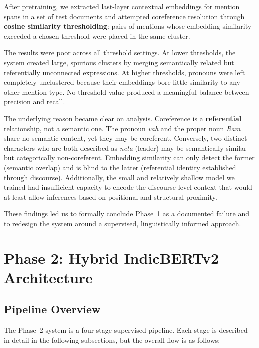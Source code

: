 \documentclass[12pt,a4paper]{report}
\begin{document}
After pretraining, we extracted last-layer contextual embeddings for mention spans in a set of test documents and attempted coreference resolution through \textbf{cosine similarity thresholding}: pairs of mentions whose embedding similarity exceeded a chosen threshold were placed in the same cluster.

The results were poor across all threshold settings. At lower thresholds, the system created large, spurious clusters by merging semantically related but referentially unconnected expressions. At higher thresholds, pronouns were left completely unclustered because their embeddings bore little similarity to any other mention type. No threshold value produced a meaningful balance between precision and recall.

The underlying reason became clear on analysis. Coreference is a \textbf{referential} relationship, not a semantic one. The pronoun \textit{vah} and the proper noun \textit{Ram} share no semantic content, yet they may be coreferent. Conversely, two distinct characters who are both described as \textit{neta} (leader) may be semantically similar but categorically non-coreferent. Embedding similarity can only detect the former (semantic overlap) and is blind to the latter (referential identity established through discourse). Additionally, the small and relatively shallow model we trained had insufficient capacity to encode the discourse-level context that would at least allow inferences based on positional and structural proximity.

These findings led us to formally conclude Phase~1 as a documented failure and to redesign the system around a supervised, linguistically informed approach.

\section{Phase 2: Hybrid IndicBERTv2 Architecture}

\subsection{Pipeline Overview}

The Phase~2 system is a four-stage supervised pipeline. Each stage is described in detail in the following subsections, but the overall flow is as follows:
\end{document}

